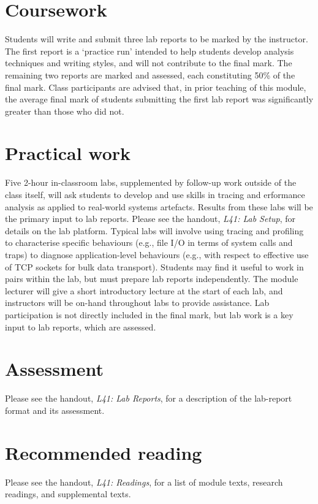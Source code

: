 \documentclass[a4paper,10pt]{article}
\begin{document}
\section{Coursework}

Students will write and submit three lab reports to be marked by the
instructor.
The first report is a `practice run' intended to help students develop 
analysis techniques and writing styles, and will not contribute to the final
mark.
The remaining two reports are marked and assessed, each constituting 50\% of
the final mark.
Class participants are advised that, in prior teaching of this module, the
average final mark of students submitting the first lab report was
significantly greater than those who did not.

\section{Practical work}

Five 2-hour in-classroom labs, supplemented by follow-up work outside of the
class itself, will ask students to develop and use skills in tracing and 
erformance analysis as applied to real-world systems artefacts.
Results from these labs will be the primary input to lab reports.
Please see the handout, \textit{L41: Lab Setup}, for details on the lab
platform.
Typical labs will involve using tracing and profiling to characterise specific
behaviours (e.g., file I/O in terms of system calls and traps) to diagnose
application-level behaviours (e.g., with respect to effective use of TCP
sockets for bulk data transport).
Students may find it useful to work in pairs within the lab, but must prepare
lab reports independently.
The module lecturer will give a short introductory lecture at the start of
each lab, and instructors will be on-hand throughout labs to provide
assistance.
Lab participation is not directly included in the final mark, but lab work is
a key input to lab reports, which are assessed.

\section{Assessment}

Please see the handout, \textit{L41: Lab Reports}, for a description of the
lab-report format and its assessment.

\section{Recommended reading}

Please see the handout, \textit{L41: Readings}, for a list of module texts,
research readings, and supplemental texts.
\end{document}
